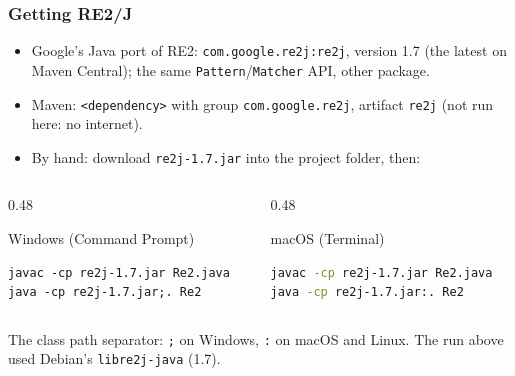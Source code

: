 \documentclass[aspectratio=169,10pt,compress]{beamer}
\begin{document}
\begin{frame}[t,fragile] \frametitle{Getting RE2/J}
  \begin{itemize}\small
    \item Google's Java port of RE2: \texttt{com.google.re2j:re2j}, version 1.7 (the latest on Maven Central); the same \texttt{Pattern}/\texttt{Matcher} API, other package.
    \item Maven: \texttt{<dependency>} with group \texttt{com.google.re2j}, artifact \texttt{re2j} (not run here: no internet).
    \item By hand: download \texttt{re2j-1.7.jar} into the project folder, then:
  \end{itemize}
  \begin{columns}[T]
    \begin{column}{0.48\textwidth}
      \begin{block}{Windows (Command Prompt)}


\begin{lstlisting}[style=codesnippet, language={}, basicstyle=\ttfamily\scriptsize]
javac -cp re2j-1.7.jar Re2.java
java -cp re2j-1.7.jar;. Re2
\end{lstlisting}


      \end{block}
    \end{column}
    \begin{column}{0.48\textwidth}
      \begin{block}{macOS (Terminal)}


\begin{lstlisting}[style=codesnippet, language=bash, basicstyle=\ttfamily\scriptsize]
javac -cp re2j-1.7.jar Re2.java
java -cp re2j-1.7.jar:. Re2
\end{lstlisting}


      \end{block}
    \end{column}
  \end{columns}

  \small The class path separator: \texttt{;} on Windows, \texttt{:} on macOS and Linux. The run above used Debian's \texttt{libre2j-java} (1.7).
\end{frame}
\end{document}
